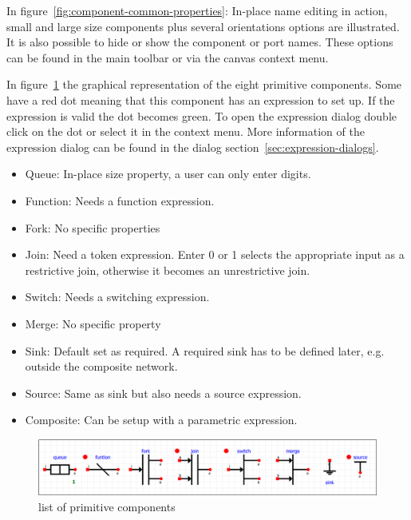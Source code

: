 In figure~\ref{fig:component-common-properties}: In-place name editing in
action, small and large size components plus several orientations options are
illustrated. It is also possible to hide or show the component or port names.
These options can be found in the main toolbar or via the canvas context menu.

In figure~\ref{fig:primitives} the graphical representation of the eight
primitive components. Some have a red dot meaning that this component has an
expression to set up. If the expression is valid the dot becomes
green. To open the expression dialog double click on the dot or select it in the
context menu. More information of the expression dialog can be found in the
dialog section~\ref{sec:expression-dialogs}.

\begin{itemize}
\item Queue: In-place size property, a user can only enter digits.
\item Function: Needs a function expression.
\item Fork: No specific properties
\item Join: Need a token expression. Enter 0 or 1 selects the appropriate
input as a restrictive join, otherwise it becomes an unrestrictive join.
\item Switch: Needs a switching expression.
\item Merge: No specific property
\item Sink: Default set as required. A required sink has to be defined later, e.g. outside the composite network.
\item Source: Same as sink but also needs a source expression.
\item Composite: Can be setup with a parametric expression.
\end{itemize}

\begin{figure}[here]
\begin{center}	
	\includegraphics[width=.70\linewidth]{pictures/primitives}
	\caption{list of primitive components}
	\label{fig:primitives}
\end{center}
\end{figure}

